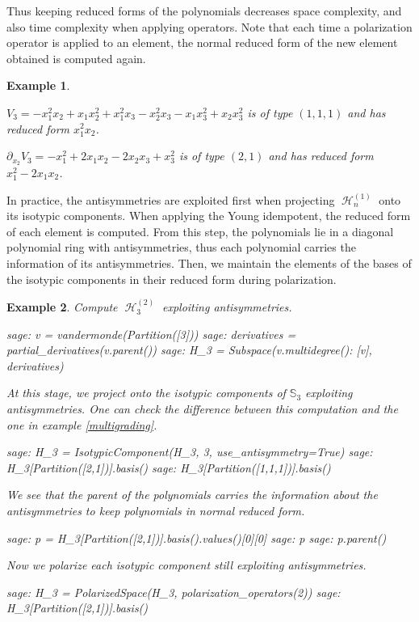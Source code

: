 \documentclass[letter,12pt]{article}
\newcommand{\Sym}[1]{\mathbb{S}_{#1}}
\DeclareMathOperator{\harmonics}{\mathcal{H}}
\newtheorem{example}{Example}
\begin{document}
	Thus keeping reduced forms of the polynomials decreases space complexity, and also time complexity when applying operators. Note that each time a polarization operator is applied to an element, the normal reduced form of the new element obtained is computed again. 
	
	\begin{example} ~
		
		$V_{3} = -x_{1}^{2} x_{2} + x_{1} x_{2}^{2} + x_{1}^{2} x_{3} - x_{2}^{2} x_{3} - x_{1} x_{3}^{2} + x_{2} x_{3}^{2}$ is of type $(1,1,1)$ and has reduced form $x_1^2x_2$.
		
		$\partial_{x_2}V_{3} = -x_{1}^{2} + 2 x_{1} x_{2} - 2 x_{2} x_{3} + x_{3}^{2}$ is of type $(2,1)$ and has reduced form $x_1^2 - 2x_1x_2$.
	\end{example}

	In practice, the antisymmetries are exploited first when projecting $\harmonics_n^{(1)}$ onto its isotypic components. When applying the Young idempotent, the reduced form of each element is computed. From this step, the polynomials lie in a diagonal polynomial ring with antisymmetries, thus each polynomial carries the information of its antisymmetries.  
	Then, we maintain the elements of the bases of the isotypic components in their reduced form during polarization. 

	\begin{example}
			Compute $\harmonics_3^{(2)}$ exploiting antisymmetries. 
		\begin{sagecommandline}
			sage: v = vandermonde(Partition([3]))
			sage: derivatives = partial_derivatives(v.parent())
			sage: H_3 = Subspace({v.multidegree(): [v]}, derivatives)
		\end{sagecommandline}
		At this stage, we project onto the isotypic components of $\Sym{3}$ exploiting antisymmetries. One can check the difference between this computation and the one in example \ref{multigrading}. 
		\begin{sagecommandline}
			sage: H_3 = IsotypicComponent(H_3, 3, use_antisymmetry=True)
			sage: H_3[Partition([2,1])].basis()
			sage: H_3[Partition([1,1,1])].basis()
		\end{sagecommandline}
		We see that the parent of the polynomials carries the information about the antisymmetries to keep polynomials in normal reduced form.
		\begin{sagecommandline}
			sage: p = H_3[Partition([2,1])].basis().values()[0][0]
			sage: p
			sage: p.parent()
		\end{sagecommandline}
		Now we polarize each isotypic component still exploiting antisymmetries.  
		\begin{sagecommandline}
			sage: H_3 = PolarizedSpace(H_3, polarization_operators(2))
			sage: H_3[Partition([2,1])].basis()
		\end{sagecommandline}
	\end{example}
	
\end{document}
